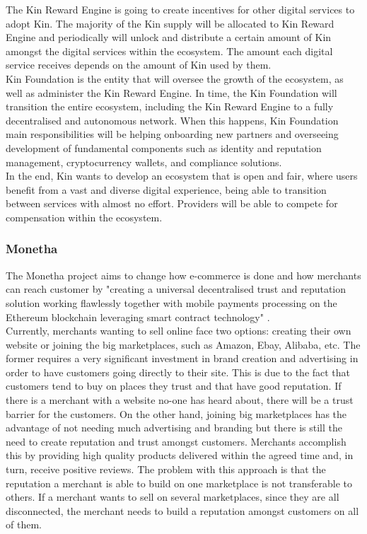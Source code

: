 The Kin Reward Engine is going to create incentives for other digital services to adopt Kin. The majority of the Kin supply will be allocated to Kin Reward Engine and periodically will unlock and distribute a certain amount of Kin amongst the digital services within the ecosystem. The amount each digital service receives depends on the amount of Kin used by them. \\

Kin Foundation is the entity that will oversee the growth of the ecosystem, as well as administer the Kin Reward Engine. In time, the Kin Foundation will transition the entire ecosystem, including the Kin Reward Engine to a fully decentralised and autonomous network. When this happens, Kin Foundation main responsibilities will be helping onboarding new partners and overseeing development of fundamental components such as identity and reputation management, cryptocurrency wallets, and compliance solutions. \\

In the end, Kin wants to develop an ecosystem that is open and fair, where users benefit from a vast and diverse digital experience, being able to transition between services with almost no effort. Providers will be able to compete for compensation within the ecosystem.

\subsubsection{Monetha}

The Monetha project aims to change how e-commerce is done and how merchants can reach customer by "creating a universal decentralised trust and reputation solution working flawlessly together with mobile payments processing on the Ethereum blockchain leveraging smart contract technology" \cite{MONETHA}. \\

Currently, merchants wanting to sell online face two options: creating their own website or joining the big marketplaces, such as Amazon, Ebay, Alibaba, etc. The former requires a very significant investment in brand creation and advertising in order to have customers going directly to their site. This is due to the fact that customers tend to buy on places they trust and that have good reputation. If there is a merchant with a website no-one has heard about, there will be a trust barrier for the customers. On the other hand, joining big marketplaces has the advantage of not needing much advertising and branding but there is still the need to create reputation and trust amongst customers. Merchants accomplish this by providing high quality products delivered within the agreed time and, in turn, receive positive reviews. The problem with this approach is that the reputation a merchant is able to build on one marketplace is not transferable to others. If a merchant wants to sell on several marketplaces, since they are all disconnected, the merchant needs to build a reputation amongst customers on all of them. \\

